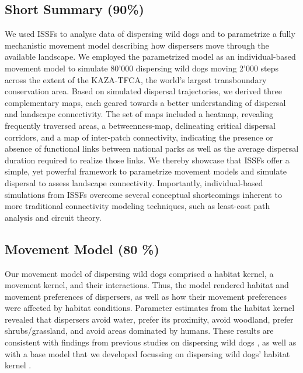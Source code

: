 \documentclass[abstract=on,10pt,a4paper,bibliography=totocnumbered]{article}
\begin{document}
\subsection{Short Summary (90\%)}
We used ISSFs to analyse data of dispersing wild dogs and to parametrize a fully
mechanistic movement model describing how dispersers move through the available
landscape. We employed the parametrized model as an individual-based movement
model to simulate 80'000 dispersing wild dogs moving 2'000 steps across the
extent of the KAZA-TFCA, the world's largest transboundary conservation area.
Based on simulated dispersal trajectories, we derived three complementary maps,
each geared towards a better understanding of dispersal and landscape
connectivity. The set of maps included a heatmap, revealing frequently traversed
areas, a betweenness-map, delineating critical dispersal corridors, and a map of
inter-patch connectivity, indicating the presence or absence of functional links
between national parks as well as the average dispersal duration required to
realize those links. We thereby showcase that ISSFs offer a simple, yet powerful
framework to parametrize movement models and simulate dispersal to assess
landscape connectivity. Importantly, individual-based simulations from ISSFs
overcome several conceptual shortcomings inherent to more traditional
connectivity modeling techniques, such as least-cost path analysis and circuit
theory.

\subsection{Movement Model (80 \%)}
Our movement model of dispersing wild dogs comprised a habitat kernel, a
movement kernel, and their interactions. Thus, the model rendered habitat and
movement preferences of dispersers, as well as how their movement preferences
were affected by habitat conditions. Parameter estimates from the habitat kernel
revealed that dispersers avoid water, prefer its proximity, avoid woodland,
prefer shrubs/grassland, and avoid areas dominated by humans. These results are
consistent with findings from previous studies on dispersing wild dogs
\citep{DaviesMostert.2012, Masenga.2016, Woodroffe.2019, Oneill.2020}, as well
as with a base model that we developed focussing on dispersing wild dogs'
habitat kernel \citep{Hofmann.2021}.
\end{document}
